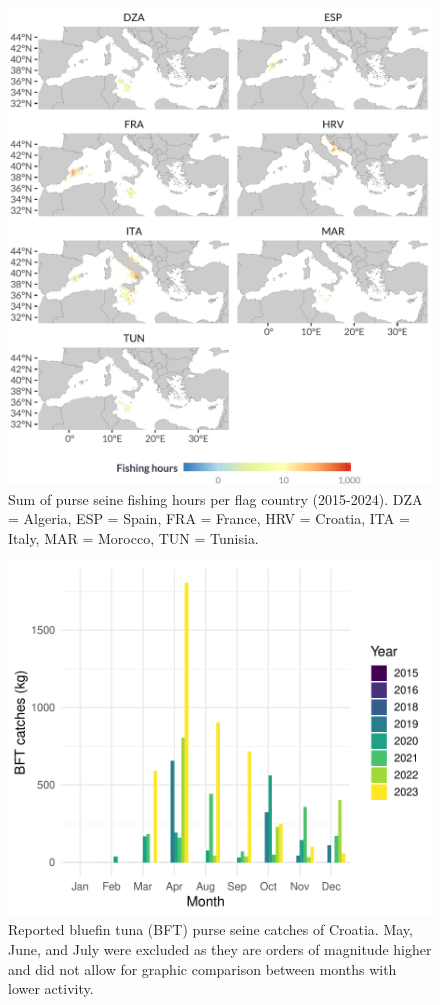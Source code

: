 \begin{figure}[H]
	\centering
	\includegraphics[width=1\linewidth, trim=0 0 0 0,clip]{Figures/plots/seines_countries.pdf}
	\caption{Sum of purse seine fishing hours per flag country (2015-2024). DZA = Algeria, ESP = Spain, FRA = France,
		HRV = Croatia, ITA = Italy, MAR = Morocco, TUN = Tunisia.}
	\label{fig:seine_effort_countries}
\end{figure}

\begin{figure}[H]
	\centering
	\includegraphics[width=1\linewidth, trim=0 0 0 0,clip]{Figures/plots/hrv_catches.pdf}
	\caption{Reported bluefin tuna (BFT) purse seine catches of Croatia. May, June, and July were excluded as they are orders of magnitude higher and did not
		allow for graphic comparison between months with lower activity.}
	\label{fig:hrv}
\end{figure}

